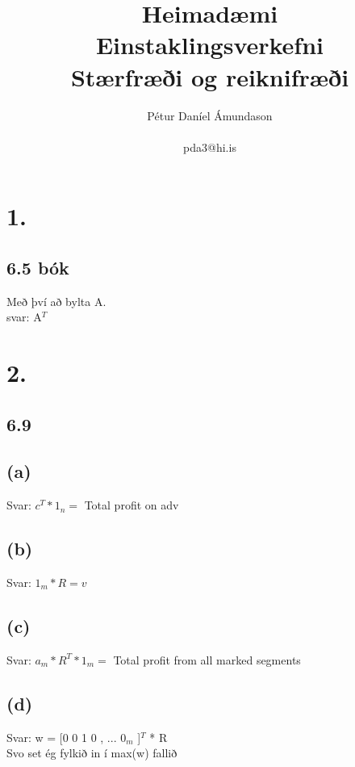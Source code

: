 \documentclass[]{article}
\begin{document}
\title{Heimadæmi  \\ Einstaklingsverkefni \\ Stærfræði og reiknifræði}
\author{Pétur Daníel Ámundason \\ \\ pda3@hi.is}
\maketitle

\section*{1.}
\subsection*{6.5 bók}
Með því að bylta A.\\
svar: A$^{T}$ 

\section*{2.}
\subsection*{6.9}

\subsection*{(a)}

Svar: $ c^{T}*1_{n} =$ Total profit on adv 

\subsection*{(b)}

Svar: $ 1_{m}*R = v $

\subsection*{(c)}

Svar: $ a_{m} * R^{T} * 1_{m} =$ Total profit from all marked segments 

\subsection*{(d)}

Svar: w = [0 0 1 0 , ... 0$ _{m}$ ]$ ^{T} $ * R \\
Svo set ég fylkið in í max(w) fallið
\end{document}
